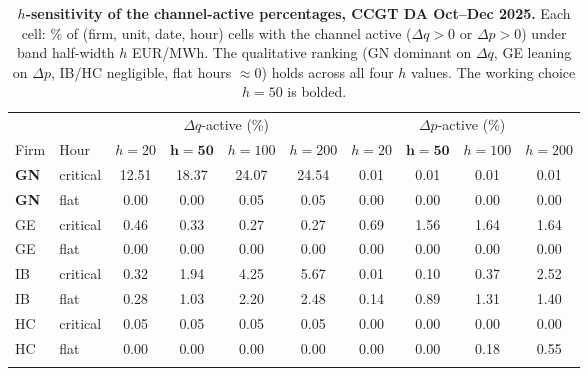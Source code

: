 \begin{table}[H]
\centering\footnotesize
\setlength{\tabcolsep}{4pt}
\caption{\textbf{$h$-sensitivity of the channel-active percentages, CCGT DA Oct--Dec 2025.} Each cell: \% of (firm, unit, date, hour) cells with the channel active ($\Delta q > 0$ or $\Delta p > 0$) under band half-width $h$ EUR/MWh. The qualitative ranking (GN dominant on $\Delta q$, GE leaning on $\Delta p$, IB/HC negligible, flat hours $\approx 0$) holds across all four $h$ values. The working choice $h=50$ is bolded.}
\label{tab:dw_h_sensitivity}
\begin{tabular}{l l c c c c | c c c c}
\toprule
 & & \multicolumn{4}{c|}{$\Delta q$-active (\%)} & \multicolumn{4}{c}{$\Delta p$-active (\%)} \\
\cmidrule(lr){3-6}\cmidrule(lr){7-10}
Firm & Hour & $h{=}20$ & $\mathbf{h{=}50}$ & $h{=}100$ & $h{=}200$ & $h{=}20$ & $\mathbf{h{=}50}$ & $h{=}100$ & $h{=}200$ \\
\midrule
\textbf{GN} & critical & 12.51 & 18.37 & 24.07 & 24.54 & 0.01 & 0.01 & 0.01 & 0.01 \\
\textbf{GN} & flat & 0.00 & 0.00 & 0.05 & 0.05 & 0.00 & 0.00 & 0.00 & 0.00 \\
\addlinespace
GE & critical & 0.46 & 0.33 & 0.27 & 0.27 & 0.69 & 1.56 & 1.64 & 1.64 \\
GE & flat & 0.00 & 0.00 & 0.00 & 0.00 & 0.00 & 0.00 & 0.00 & 0.00 \\
\addlinespace
IB & critical & 0.32 & 1.94 & 4.25 & 5.67 & 0.01 & 0.10 & 0.37 & 2.52 \\
IB & flat & 0.28 & 1.03 & 2.20 & 2.48 & 0.14 & 0.89 & 1.31 & 1.40 \\
\addlinespace
HC & critical & 0.05 & 0.05 & 0.05 & 0.05 & 0.00 & 0.00 & 0.00 & 0.00 \\
HC & flat & 0.00 & 0.00 & 0.00 & 0.00 & 0.00 & 0.00 & 0.18 & 0.55 \\
\addlinespace
\bottomrule
\end{tabular}
\end{table}
